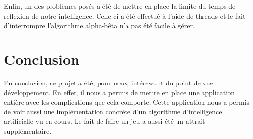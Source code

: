 \documentclass[11pt,a4paper]{article}
\begin{document}
Enfin, un des problèmes posés a été de mettre en place la limite du temps de
reflexion de notre intelligence. Celle-ci a été effectué à l'aide de threads et
le fait d'interrompre l'algorithme alpha-bêta n'a pas été facile à gérer.
 
\section{Conclusion}
En conclusion, ce projet a été, pour nous, intéressant du point de vue
développement. En effet, il nous a permis de mettre en place une application
entière avec les complications que cela comporte. Cette application nous a
permis de voir aussi une implémentation concrète d'un algorithme d'intelligence
artificielle vu en cours. Le fait de faire un jeu a aussi été un attrait
supplémentaire.
\end{document}
